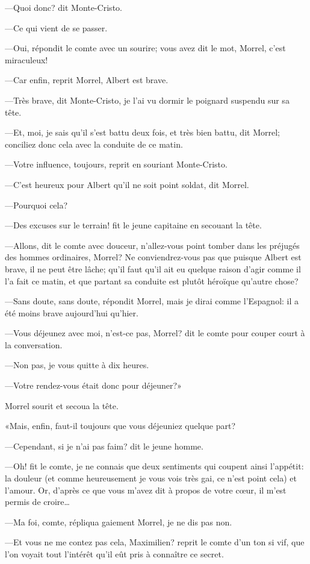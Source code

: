—Quoi donc? dit Monte-Cristo. 

—Ce qui vient de se passer. 

—Oui, répondit le comte avec un sourire; vous avez dit le mot, Morrel, c'est miraculeux! 

—Car enfin, reprit Morrel, Albert est brave. 

—Très brave, dit Monte-Cristo, je l'ai vu dormir le poignard suspendu sur sa tête. 

—Et, moi, je sais qu'il s'est battu deux fois, et très bien battu, dit Morrel; conciliez donc cela avec la conduite de ce matin. 

—Votre influence, toujours, reprit en souriant Monte-Cristo. 

—C'est heureux pour Albert qu'il ne soit point soldat, dit Morrel. 

—Pourquoi cela? 

—Des excuses sur le terrain! fit le jeune capitaine en secouant la tête. 

—Allons, dit le comte avec douceur, n'allez-vous point tomber dans les préjugés des hommes ordinaires, Morrel? Ne conviendrez-vous pas que puisque Albert est brave, il ne peut être lâche; qu'il faut qu'il ait eu quelque raison d'agir comme il l'a fait ce matin, et que partant sa conduite est plutôt héroïque qu'autre chose? 

—Sans doute, sans doute, répondit Morrel, mais je dirai comme l'Espagnol: il a été moins brave aujourd'hui qu'hier. 

—Vous déjeunez avec moi, n'est-ce pas, Morrel? dit le comte pour couper court à la conversation. 

—Non pas, je vous quitte à dix heures. 

—Votre rendez-vous était donc pour déjeuner?» 

Morrel sourit et secoua la tête. 

«Mais, enfin, faut-il toujours que vous déjeuniez quelque part? 

—Cependant, si je n'ai pas faim? dit le jeune homme. 

—Oh! fit le comte, je ne connais que deux sentiments qui coupent ainsi l'appétit: la douleur (et comme heureusement je vous vois très gai, ce n'est point cela) et l'amour. Or, d'après ce que vous m'avez dit à propos de votre cœur, il m'est permis de croire\dots 

—Ma foi, comte, répliqua gaiement Morrel, je ne dis pas non. 

—Et vous ne me contez pas cela, Maximilien? reprit le comte d'un ton si vif, que l'on voyait tout l'intérêt qu'il eût pris à connaître ce secret. 

